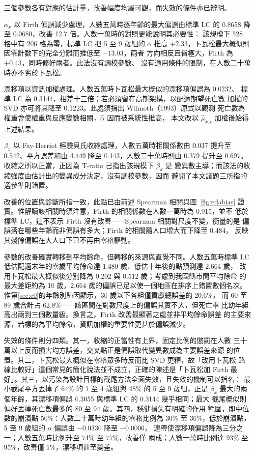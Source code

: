 \documentclass[UTF8, fontset=macnew, a4paper, 12pt]{ctexart}
\begin{document}
三個參數各有對應的估計量，改善幅度均屬可觀，而失效的條件亦已辨明。

$\alpha_x$ 以 Firth 偏誤減少處理，人數五萬時逐年齡的最大偏誤由標準 LC 的
0.8658 降至 0.0680，改善 12.7 倍。人數一萬時的對照更能說明其必要性：
該規模下 528 格中有 206 格為零，標準 LC 把 5 至 9 歲組的 $\alpha$ 推高
$+2.33$，卜瓦松最大概似則因零計數下的完全分離而推低至 $-13.03$，兩者
方向相反且皆極大，Firth 為 $+0.43$，同時修好兩者。此法沒有調校參數、
沒有適用條件的限制，在人數二十萬時亦不劣於卜瓦松。

漂移項以資訊加權處理。人數五萬時卜瓦松最大概似的漂移項偏誤為 0.0232、
標準 LC 為 0.3144，相差十三倍；若必須留在高斯架構，以配適期望死亡數
加權的 SVD 亦可將其降至 0.1223。此處須指出 Wilmoth（1993）原式以觀測
死亡數為權重會使權重與反應變數相關，$\hat\alpha$ 因而被系統性推高，
本文改以 $\hat\mu_{x,t}$ 加權後始得上述結果。

$\beta_x$ 以 Fay-Herriot 經驗貝氏收縮處理，人數五萬時相關係數由 0.037
提升至 0.542、平方誤差和由 4.449 降至 0.143，人數二十萬時則由 0.379
提升至 0.697。收縮之所以正當，正因為 T-ratio 已指出該規模下 $\beta_x$ 是
變異數主導；而該法的收縮強度由估計出的變異成分決定，沒有調校參數，因而
避開了本文議題三所指的選參準則錯置。

改善的位置與診斷所指一致，此點已由前述 Spearman 相關與圖~\ref{fig:edabias}
證實。惟解讀該相關時須注意，Firth 的相關係數在人數一萬時為 0.915，並不
低於標準 LC，這不表示 Firth 沒有改善——Spearman 相關對尺度不變，衡量的是
偏誤落在哪些年齡而非偏誤有多大；Firth 的相關隨人口增大而下降至 0.484，
反映其殘餘偏誤在大人口下已不再由零格驅動。

參數的改善確實轉移到平均餘命，但轉移的來源與直覺不同。人數五萬時標準 LC
低估配適末年的零歲平均餘命達 1.480 歲、低估十年後的點預測達 2.664 歲，
改用卜瓦松最大概似後分別降為 0.202 與 0.512 歲；考慮到我國縣市間平均餘命
的最大差距約為 10 歲，2.664 歲的偏誤已足以使一個地區在排序上錯置數個名次。
惟第\ref{sec:e0}的年齡別歸因顯示，30 歲以下各組僅貢獻總誤差的 20.6\%，
而 60 至 89 歲合計占 62.8\%——該區間在對數尺度上的偏誤其實不大，但死亡率
比幼年組高出兩到三個數量級。換言之，Firth 改善最顯著之處並非平均餘命誤差
的主要來源，若標的為平均餘命，資訊加權的重要性更甚於偏誤減少。

失效的條件則分四類。其一，收縮的正當性有上界，固定比例的懲罰在人數
三十萬以上反而損害均方誤差，交叉點正是偏誤取代變異數成為主要誤差來源
的位置。其二，卜瓦松最大概似在零格眾多時反而比 SVD 更糟，故「改用卜瓦松
路線比較好」這個常見的簡化說法並不成立，正確的陳述是「卜瓦松加 Firth
最好」。其三，以污染為設計目標的截尾方法全面失效，且失效的機制可以指名：
最小截尾平方丟掉了 64\% 的 1 至 4 歲組與 48\% 的 5 至 9 歲組，正是 $\beta_x$
最大的兩個年齡，其漂移項偏誤 0.3055 與標準 LC 的 0.3144 幾乎相同；最大
截尾概似則偏好丟掉死亡數最多的 80 至 94 歲。其四，穩健損失有明確的作用
範圍，即中位數的崩潰點 50\%：人數二十萬時幼年組的零格比例為 30\% 至
36\%，低於崩潰點，5 至 9 歲組的 $\alpha$ 偏誤由 $-0.0330$ 降至 $-0.0006$，
連帶使漂移項偏誤降為三分之一；人數五萬時比例升至 74\% 至 77\%，改善僅
兩成；人數一萬時比例達 93\% 至 95\%，改善僅 1\%，漂移項甚至變差。
\end{document}

